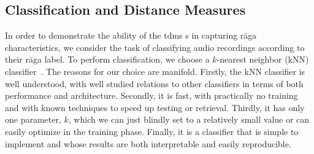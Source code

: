 \subsection{Classification and Distance Measures}
\label{sec:tdms_classification_evaluation}

% 


In order to demonstrate the ability of the \gls{tdms} s in capturing r\={a}ga characteristics, we consider the task of classifying audio recordings according to their r\={a}ga label. To perform classification, we choose a $k$-nearest neighbor (kNN) classifier~\cite{Mitchell97BOOK}. The reasons for our choice are manifold. Firstly, the kNN classifier is well understood, with well studied relations to other classifiers in terms of both performance and architecture. Secondly, it is fast, with practically no training and with known techniques to speed up testing or retrieval. Thirdly, it has only one parameter, $k$, which we can just blindly set to a relatively small value or can easily optimize in the training phase. Finally, it is a classifier that is simple to implement and whose results are both interpretable and easily reproducible. 

